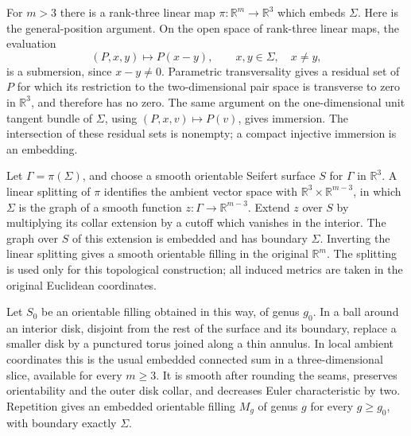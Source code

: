 \documentclass[11pt]{article}
\theoremstyle{remark}
\newcommand{\R}{\mathbb R}
\begin{document}
For $m>3$ there is a rank-three linear map
$\pi:\R^m\to\R^3$ which embeds $\Sigma$. Here is the general-position
argument. On the open space of rank-three linear maps, the evaluation
\[
 (P,x,y)\longmapsto P(x-y),\qquad x,y\in\Sigma,\quad x\ne y,
\]
is a submersion, since $x-y\ne0$. Parametric transversality
\cite[Theorem~3.2.7]{Hirsch} gives a residual set of $P$ for which its
restriction to the two-dimensional pair space is transverse to zero
in $\R^3$, and therefore has no zero. The same argument on the
one-dimensional unit tangent bundle of $\Sigma$, using $(P,x,v)\mapsto
P(v)$, gives immersion. The intersection of these residual sets is
nonempty; a compact injective immersion is an embedding.

Let $\Gamma=\pi(\Sigma)$, and choose a smooth orientable Seifert surface
$S$ for $\Gamma$ in $\R^3$. A linear splitting of $\pi$ identifies the
ambient vector space with $\R^3\times\R^{m-3}$, in which $\Sigma$ is the
graph of a smooth function $z:\Gamma\to\R^{m-3}$. Extend $z$ over $S$
by multiplying its collar extension by a cutoff which vanishes in the
interior. The graph over $S$ of this extension is embedded and has
boundary $\Sigma$. Inverting the linear splitting gives a smooth
orientable filling in the original $\R^m$. The splitting is used only
for this topological construction; all induced metrics are taken in
the original Euclidean coordinates.

Let $S_0$ be an orientable filling obtained in this way, of genus $g_0$.
In a ball around an interior disk, disjoint from the rest of the surface
and its boundary, replace a smaller disk by a punctured torus joined
along a thin annulus. In local ambient coordinates this is the usual
embedded connected sum in a three-dimensional slice, available for
every $m\geq3$. It is smooth after rounding the seams, preserves
orientability and the outer disk collar, and decreases Euler
characteristic by two. Repetition gives an embedded orientable filling
$M_g$ of genus $g$ for every $g\geq g_0$, with boundary exactly $\Sigma$.
\end{document}
